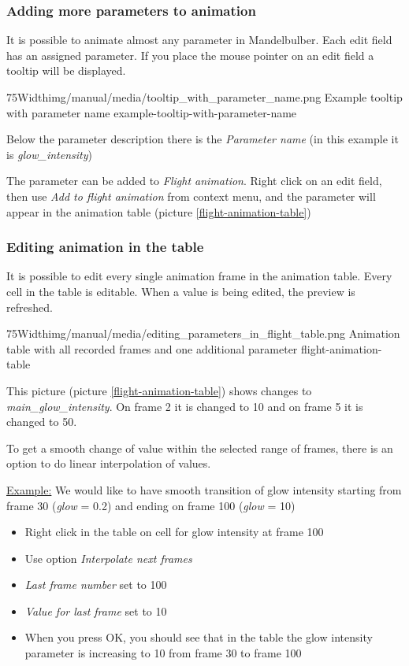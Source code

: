 	\subsubsection{Adding more parameters to animation}
	
	It is possible to animate almost any parameter in Mandelbulber. Each edit field has an assigned parameter. If you place the mouse pointer on an edit field a tooltip will be displayed. 
	
	\simpleImageWithCaption75Width{img/manual/media/tooltip_with_parameter_name.png}
	{Example tooltip with parameter name}
	{example-tooltip-with-parameter-name}
		
	Below the parameter description there is the \emph{Parameter name} (in this example it is \emph{glow\_intensity})
	
	The parameter can be added to \emph{Flight animation}. Right click on an edit field, then use \emph{Add to flight animation} from context menu, and the parameter will appear in the animation table  (picture \ref{flight-animation-table})
			
	\subsubsection{Editing animation in the table}
	
	It is possible to edit every single animation frame in the animation table. Every cell in the table is editable.  When a value is being edited, the preview is refreshed.
	
		\simpleImageWithCaption75Width{img/manual/media/editing_parameters_in_flight_table.png}
	{Animation table with all recorded frames and one additional parameter}
	{flight-animation-table}
	
	This picture (picture \ref{flight-animation-table}) shows changes to \emph{main\_glow\_intensity}. On frame 2 it is changed to 10 and on frame 5 it is changed to 50.
	
	To get a smooth change of value within the selected range of frames, there is an option to do linear interpolation of values. 
	
	\underline{Example:} We would like to have smooth transition of glow intensity starting from frame 30 (\emph{glow} = 0.2) and ending on frame 100 (\emph{glow} = 10)
	\begin{itemize}
		\item Right click in the table on cell for glow intensity at frame 100
		\item Use option  \emph{Interpolate next frames}
		\item \emph{Last frame number} set to 100
		\item \emph{Value for last frame} set to 10
		\item When you press OK, you should see that in the table the glow intensity parameter is increasing to 10 from frame 30 to frame 100
	\end{itemize} 
	
